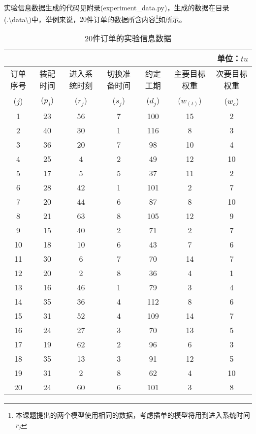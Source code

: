 实验信息数据生成的代码见附录(experiment\_data.py)，生成的数据在目录(.\textbackslash data\textbackslash)中，举例来说，$20$件订单的数据所含内容\footnote{本课题提出的两个模型使用相同的数据，考虑插单的模型将用到进入系统时间$r_j$}如所示。
\begin{table}[h]
  \centering
  \caption{$20$件订单的实验信息数据}
    \begin{tabular}{ccccccc}
     	&	&	&	&	&	&\multicolumn{1}{r}{单位：$tu$}\\
    \toprule
    订单序号 & 装配时间 & 进入系统时刻 & 切换准备时间& 约定工期 & 主要目标权重 & 次要目标权重 \\
    ($j$) & ($p_j$) & ($r_j$) &($s_j$) &($d_j$) &($w_{(t)}$) & ($w_c$) \\
    \midrule
    1     & 23    & 56    & 7     & 100   & 15    & 2 \\
    2     & 40    & 30    & 1     & 116   & 8     & 3 \\
    3     & 36    & 20    & 7     & 98    & 10    & 4 \\
    4     & 25    & 4     & 2     & 49    & 12    & 10 \\
    5     & 17    & 5     & 5     & 37    & 11    & 2 \\
    6     & 28    & 42    & 1     & 101   & 2     & 7 \\
    7     & 20    & 44    & 6     & 87    & 8     & 10 \\
    8     & 21    & 63    & 8     & 105   & 12    & 9 \\
    9     & 15    & 40    & 2     & 71    & 2     & 7 \\
    10    & 18    & 10    & 6     & 43    & 7     & 6 \\
    11    & 30    & 6     & 7     & 70    & 14    & 7 \\
    12    & 20    & 2     & 8     & 36    & 4     & 1 \\
    13    & 16    & 46    & 1     & 79    & 3     & 4 \\
    14    & 35    & 36    & 4     & 112   & 8     & 6 \\
    15    & 31    & 52    & 4     & 109   & 14    & 7 \\
    16    & 24    & 27    & 3     & 70    & 13    & 5 \\
    17    & 19    & 62    & 2     & 96    & 6     & 3 \\
    18    & 35    & 13    & 3     & 91    & 12    & 5 \\
    19    & 31    & 2     & 8     & 62    & 4     & 10 \\
    20    & 24    & 60    & 6     & 101   & 3     & 8 \\
    \bottomrule
    \end{tabular}
  \label{tab:20itemsdata}
\end{table}
